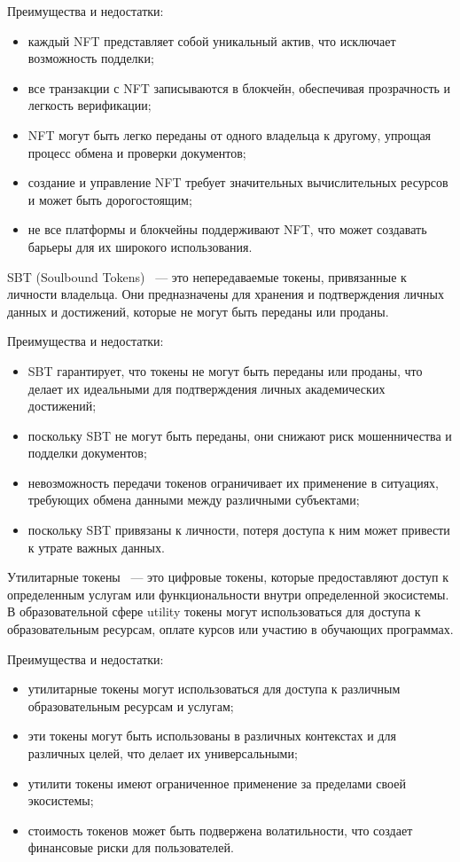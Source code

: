 Преимущества и недостатки:
\begin{itemize}
    \item каждый NFT представляет собой уникальный актив, что исключает возможность подделки;
    \item все транзакции с NFT записываются в блокчейн, обеспечивая прозрачность и легкость верификации;
    \item NFT могут быть легко переданы от одного владельца к другому, упрощая процесс обмена и проверки документов;
    \item создание и управление NFT требует значительных вычислительных ресурсов и может быть дорогостоящим;
    \item не все платформы и блокчейны поддерживают NFT, что может создавать барьеры для их широкого использования.
\end{itemize}

SBT (Soulbound Tokens)~\cite{bib:what_is_sbt} --- это непередаваемые токены, привязанные к личности владельца. Они предназначены для хранения и подтверждения личных данных и достижений, которые не могут быть переданы или проданы.

Преимущества и недостатки:
\begin{itemize}
    \item SBT гарантирует, что токены не могут быть переданы или проданы, что делает их идеальными для подтверждения личных академических достижений;
    \item поскольку SBT не могут быть переданы, они снижают риск мошенничества и подделки документов;
    \item невозможность передачи токенов ограничивает их применение в ситуациях, требующих обмена данными между различными субъектами;
    \item поскольку SBT привязаны к личности, потеря доступа к ним может привести к утрате важных данных.
\end{itemize}

Утилитарные токены~\cite{bib:what_is_utt} --- это цифровые токены, которые предоставляют доступ к определенным услугам или функциональности внутри определенной экосистемы. В образовательной сфере utility токены могут использоваться для доступа к образовательным ресурсам, оплате курсов или участию в обучающих программах.

Преимущества и недостатки:
\begin{itemize}
    \item утилитарные токены могут использоваться для доступа к различным образовательным ресурсам и услугам;
    \item эти токены могут быть использованы в различных контекстах и для различных целей, что делает их универсальными;
    \item утилити токены имеют ограниченное применение за пределами своей экосистемы;
    \item стоимость токенов может быть подвержена волатильности, что создает финансовые риски для пользователей.
\end{itemize}

